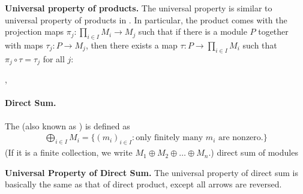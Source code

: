 \textbf{Universal property of products.}
The universal property is similar to universal property
of products in .
In particular, the product comes with the projection maps 
$\pi_j : \prod_{i\in I} M_i \to M_j$ such that if 
there is a module $P$ together with maps $\tau_j : P\to M_j$,
then there exists a map $\tau :P\to\prod_{i\in I}M_i$
such that $\pi_j \circ \tau = \tau_j$ for all $j$:
\begin{center}
,
\end{center}

\paragraph{Direct Sum.}
The  (also known as ) 
is defined as
\begin{align*}
\bigoplus_{i\in I} M_i
= \Big\{(m_i)_{i\in I} : \text{
only finitely many } m_i \text{ are nonzero.}\Big\}
\end{align*}
(If it is a finite collection, we write
$M_1\oplus M_2 \oplus \dots\oplus M_n$.)
{direct sum of modules}

\textbf{Universal Property of Direct Sum.}
The universal property of direct sum is basically the same 
as that of direct product, except all arrows are reversed.

